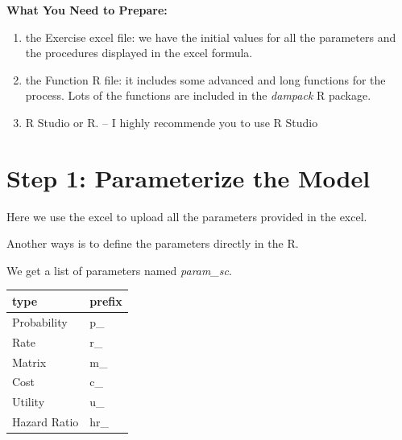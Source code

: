 \documentclass[
  letterpaper,
  DIV=11,
  numbers=noendperiod,
  oneside]{scrartcl}
\providecommand{\tightlist}{%
  \setlength{\itemsep}{0pt}\setlength{\parskip}{0pt}}\usepackage{longtable,booktabs,array}
\begin{document}
\begin{tcolorbox}[enhanced jigsaw, rightrule=.15mm, toprule=.15mm, opacitybacktitle=0.6, colback=white, leftrule=.75mm, opacityback=0, bottomtitle=1mm, arc=.35mm, titlerule=0mm, colbacktitle=quarto-callout-note-color!10!white, breakable, title=\textcolor{quarto-callout-note-color}{\faInfo}\hspace{0.5em}{Note}, toptitle=1mm, bottomrule=.15mm, left=2mm, colframe=quarto-callout-note-color-frame, coltitle=black]

\textbf{What You Need to Prepare:}

\begin{enumerate}
\def\labelenumi{\arabic{enumi}.}
\tightlist
\item
  the Exercise excel file: we have the initial values for all the
  parameters and the procedures displayed in the excel formula.
\item
  the Function R file: it includes some advanced and long functions for
  the process. Lots of the functions are included in the \emph{dampack}
  R package.
\item
  R Studio or R. -- I highly recommende you to use R Studio
\end{enumerate}

\end{tcolorbox}

\hypertarget{step-1-parameterize-the-model}{%
\section{Step 1: Parameterize the
Model}\label{step-1-parameterize-the-model}}

Here we use the excel to upload all the parameters provided in the
excel.

Another ways is to define the parameters directly in the R.

We get a list of parameters named \emph{param\_sc}.

\begin{tabular}{l|l}
\hline
type & prefix\\
\hline
Probability & p\_\\
\hline
Rate & r\_\\
\hline
Matrix & m\_\\
\hline
Cost & c\_\\
\hline
Utility & u\_\\
\hline
Hazard Ratio & hr\_\\
\hline
\end{tabular}
\end{document}
